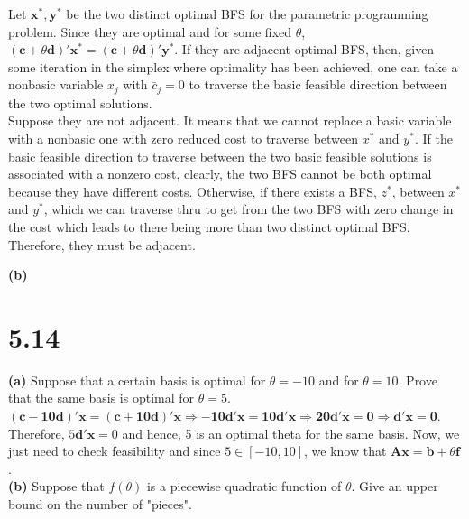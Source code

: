 \documentclass{article}
\begin{document}
\noindent
Let $ \mathbf{x^*, y^*}$ be the two distinct optimal BFS for the parametric programming problem.  Since they are optimal and for some fixed $\theta$, $(\mathbf{c} + \theta \mathbf{d})\mathbf{' x^*} = (\mathbf{c} + \theta \mathbf{d})\mathbf{' y^*}$.  If they are adjacent optimal BFS, then, given some iteration in the simplex where optimality has been achieved, one can take a nonbasic variable $x_j$ with $\bar{c}_j = 0$ to traverse the basic feasible direction between the two optimal solutions.  \\

\noindent
Suppose they are not adjacent.  It means that we cannot replace a basic variable with a nonbasic one with zero reduced cost to traverse between $x^*$ and $y^*$.  If the basic feasible direction to traverse between the two basic feasible solutions is associated with a nonzero cost, clearly, the two BFS cannot be both optimal because they have different costs.  Otherwise,  if there exists a BFS, $z^*$, between $x^*$ and $y^*$, which we can traverse thru to get from the two BFS with zero change in the cost which leads to there being more than two distinct optimal BFS.  Therefore, they must be adjacent.

\textbf{(b)}

\section*{5.14}
\textbf{(a)} Suppose that a certain basis is optimal for $\theta = -10$ and for $\theta = 10$.  Prove that the same basis is optimal for $\theta = 5$.  \\

\noindent
$\mathbf{(c - 10d)' x = (c + 10d)' x \Rightarrow -10d'x = 10d'x \Rightarrow 20d'x = 0 \Rightarrow d'x = 0}$.  Therefore, $5 \mathbf{d'x} = 0$ and hence, 5 is an optimal theta for the same basis.  Now, we just need to check feasibility and since $5 \in [-10, 10]$, we know that $\mathbf{Ax = b} + \theta \mathbf{f}$. \\

\textbf{(b)}  Suppose that $f(\theta)$ is a piecewise quadratic function of $\theta$.  Give an upper bound on the number of "pieces". \\

\noindent
\end{document}
